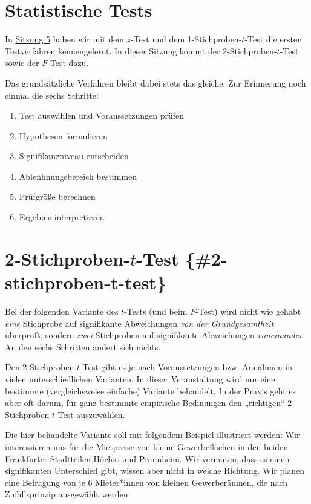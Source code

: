 \documentclass[
  11pt,
  ngerman,
  a4paper,
]{report}
\providecommand{\tightlist}{%
  \setlength{\itemsep}{0pt}\setlength{\parskip}{0pt}}
\begin{document}
\hypertarget{statistische-tests-1}{%
\section{Statistische Tests}\label{statistische-tests-1}}

In \href{grundlagen-der-teststatistik.html}{Sitzung 5} haben wir mit dem \(z\)-Test und dem 1-Stichproben-\(t\)-Test die ersten Testverfahren kennengelernt. In dieser Sitzung kommt der 2-Stichproben-\(t\)-Test sowie der \(F\)-Test dazu.

Das grundsätzliche Verfahren bleibt dabei stets das gleiche. Zur Erinnerung noch einmal die sechs Schritte:

\begin{enumerate}
\def\labelenumi{\arabic{enumi}.}
\tightlist
\item
  Test auswählen und Voraussetzungen prüfen
\item
  Hypothesen formulieren
\item
  Signifikanzniveau entscheiden
\item
  Ablenhnungsbereich bestimmen
\item
  Prüfgröße berechnen
\item
  Ergebnis interpretieren
\end{enumerate}

\hypertarget{stichproben-t-test-2-stichproben-t-test}{%
\section{\texorpdfstring{2-Stichproben-\(t\)-Test \{\#2-stichproben-t-test\}}{2-Stichproben-t-Test \{\#2-stichproben-t-test\}}}\label{stichproben-t-test-2-stichproben-t-test}}

Bei der folgenden Variante des \(t\)-Tests (und beim \(F\)-Test) wird nicht wie gehabt \emph{eine} Stichprobe auf signifikante Abweichungen \emph{von der Grundgesamtheit} überprüft, sondern \emph{zwei} Stichproben auf signifikante Abweichungen \emph{voneinander.} An den sechs Schritten ändert sich nichts.

Den 2-Stichproben-\(t\)-Test gibt es je nach Voraussetzungen bzw. Annahmen in vielen unterschiedlichen Varianten. In dieser Veranstaltung wird nur eine bestimmte (vergleichsweise einfache) Variante behandelt. In der Praxis geht es aber oft darum, für ganz bestimmte empirische Bedinungen den „richtigen`` 2-Stichproben-\(t\)-Test auszuwählen.

Die hier behandelte Variante soll mit folgendem Beispiel illustriert werden: Wir interessieren uns für die Mietpreise von kleine Gewerbeflächen in den beiden Frankfurter Stadtteilen Höchst und Praunheim. Wir vermuten, dass es einen signifikanten Unterschied gibt, wissen aber nicht in welche Richtung. Wir planen eine Befragung von je 6 Mieter*innen von kleinen Gewerberäumen, die nach Zufallsprinzip ausgewählt werden.
\end{document}
